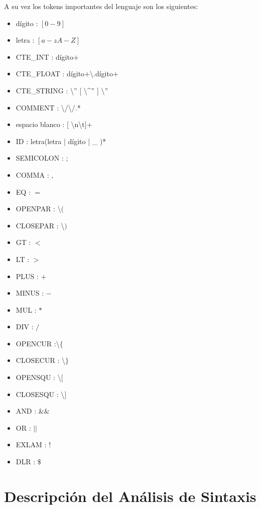A su vez los tokens importantes del lenguaje son los siguientes:

\begin{itemize}
    \item dígito : $[0-9]$
    \item letra : $[a-zA-Z]$
    \item CTE\_INT : dígito$+$
    \item CTE\_FLOAT : dígito$+$\textbackslash .dígito$+$
    \item CTE\_STRING : \textbackslash” [ \textbackslash \textasciicircum  ” ] \textbackslash”
    \item COMMENT : \textbackslash /\textbackslash /.*
    \item espacio blanco : [ \textbackslash n\textbackslash t]$+$
    
    \item ID : letra(letra | dígito | \_ )*
    \item SEMICOLON : $;$
    \item COMMA : $,$
    \item EQ : $=$
    \item OPENPAR : \textbackslash$($
    \item CLOSEPAR : \textbackslash$)$
    \item GT : $<$
    \item LT : $>$
    \item PLUS : $+$
    \item MINUS : $-$
    \item MUL : $*$
    \item DIV : $/$
    \item OPENCUR :\textbackslash $ \{ $
    \item CLOSECUR : \textbackslash $\}$
    \item OPENSQU : \textbackslash $[$
    \item CLOSESQU : \textbackslash $]$
    \item AND : $\&\&$
    \item OR : $||$
    \item EXLAM : $!$
    \item DLR : $\$$
\end{itemize}


\FloatBarrier
\section{Descripción del Análisis de Sintaxis}

